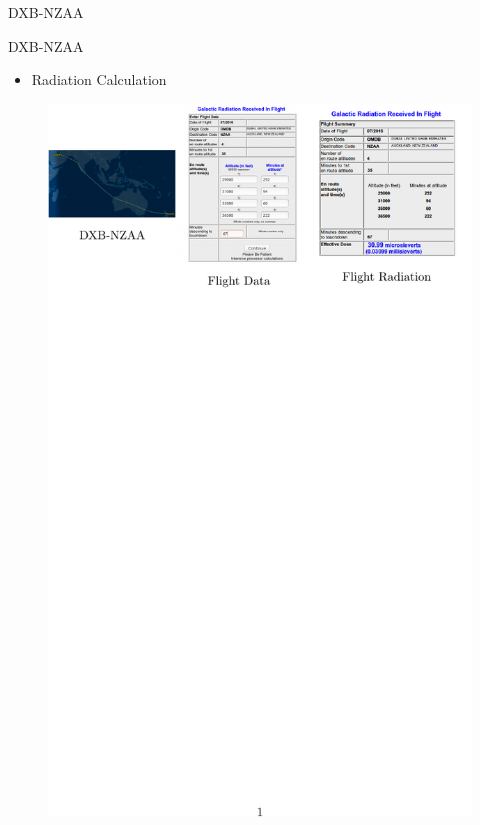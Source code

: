 \documentclass[aspectratio=1610]{beamer}
\begin{document}
\begin{frame}{DXB-NZAA}

\begin{block}{DXB-NZAA}
\end{block}
\begin{itemize}
\item Radiation Calculation

\end{itemize}
\vspace{-0.5cm}
\begin{figure}[]

   \includegraphics[scale=1.1]{images/DXB-TO-NZAA.pdf}   
 \end{figure}
 
\end{frame}
\end{document}
